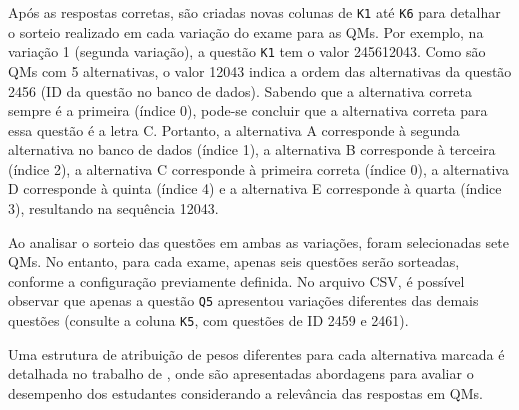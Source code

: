 Após as respostas corretas, são criadas novas colunas de \verb|K1| até \verb|K6| para detalhar o sorteio realizado em cada variação do exame para as QMs. Por exemplo, na variação 1 (segunda variação), a questão \verb|K1| tem o valor 245612043. Como são QMs com 5 alternativas, o valor 12043 indica a ordem das alternativas da questão 2456 (ID da questão no banco de dados). Sabendo que a alternativa correta sempre é a primeira (índice 0), pode-se concluir que a alternativa correta para essa questão é a letra C. Portanto, a alternativa A corresponde à segunda alternativa no banco de dados (índice 1), a alternativa B corresponde à terceira (índice 2), a alternativa C corresponde à primeira correta (índice 0), a alternativa D corresponde à quinta (índice 4) e a alternativa E corresponde à quarta (índice 3), resultando na sequência 12043. 

Ao analisar o sorteio das questões em ambas as variações, foram selecionadas sete QMs. No entanto, para cada exame, apenas seis questões serão sorteadas, conforme a configuração previamente definida. No arquivo CSV, é possível observar que apenas a questão \verb|Q5| apresentou variações diferentes das demais questões (consulte a coluna \verb|K5|, com questões de ID 2459 e 2461).

Uma estrutura de atribuição de pesos diferentes para cada alternativa marcada é detalhada no trabalho de  , onde são apresentadas abordagens para avaliar o desempenho dos estudantes considerando a relevância das respostas em QMs.




